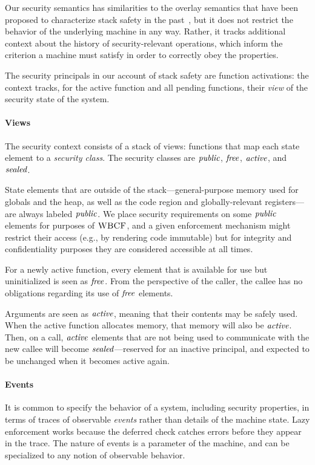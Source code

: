 \documentclass[10pt,conference]{ieeetran}%
\theoremstyle{definition}
\begin{document}
Our security semantics has similarities to the overlay semantics that have been proposed
to characterize stack safety in the past~\cite{SkorstengaardSTK}, but it does not restrict
the behavior of the underlying machine in any way. Rather, it tracks additional context
about the history of security-relevant operations, which inform the criterion a machine
must satisfy in order to correctly obey the properties.

The security principals in our account of stack safety are function
activations: the context tracks, for the active function and all pending
functions, their {\em view} of the security state of the system.

\paragraph*{Views}

The security context consists of a stack of views: functions that map
each state element to a {\it security class}. The security classes are
\(\mathit{public}\), \(\mathit{free}\), \(\mathit{active}\), and \(\mathit{sealed}\).

State elements that are outside of the stack---general-purpose memory used for
globals and the heap, as well as the code region and globally-relevant
registers---are always labeled \(\mathit{public}\). We place security requirements on some
\(\mathit{public}\) elements for purposes of \(\textnormal{\sc WBCF}\), and a given enforcement mechanism
might restrict their access (e.g., by rendering code immutable) but for integrity
and confidentiality purposes they are considered accessible at all times.

For a newly active function, every element that is available for use but uninitialized
is seen as \(\mathit{free}\). From the perspective of the caller, the callee has no obligations
regarding its use of \(\mathit{free}\) elements.

Arguments are seen as \(\mathit{active}\), meaning that their contents may be safely used.
When the active function allocates memory, that memory will also be \(\mathit{active}\).
Then, on a call, \(\mathit{active}\) elements that are not being used to communicate with
the new callee will become \(\mathit{sealed}\)---reserved for an inactive principal,
and expected to be unchanged when it becomes active again.

\paragraph*{Events}

It is common to specify the behavior of a system, including security properties, in
terms of traces of observable {\em events} rather than details of the machine state.
Lazy enforcement works because the deferred check catches errors before they appear
in the trace. The nature of events is a parameter of the machine, and can be specialized
to any notion of observable behavior.
\end{document}
